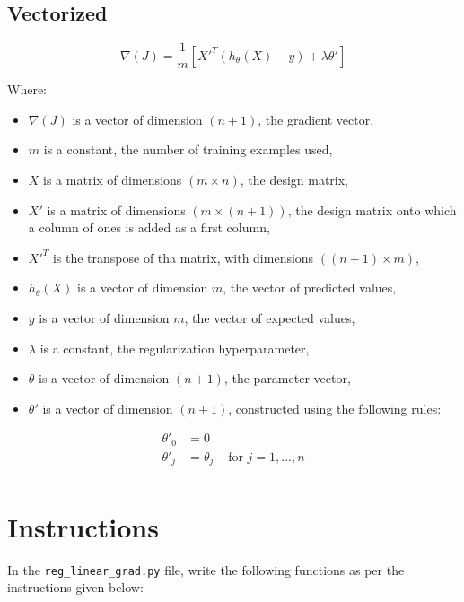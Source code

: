 \documentclass{42-en}
\begin{document}
\subsection*{Vectorized}
$$
\nabla(J) = \frac{1}{m} [X'^T(h_\theta(X) - y) + \lambda \theta']
$$  

Where:
\begin{itemize}
  \item $\nabla(J)$ is a vector of dimension $(n + 1)$, the gradient vector,
  \item $m$ is a constant, the number of training examples used,
  \item $X$ is a matrix of dimensions $(m \times n)$, the design matrix,
  \item $X'$ is a matrix of dimensions $(m \times (n + 1))$, the design matrix onto which a column of ones is added as a first column,
  \item $X'^T$ is the transpose of tha matrix, with dimensions $((n + 1) \times m)$,
  \item $h_\theta(X)$ is a vector of dimension $m$, the vector of predicted values, 
  \item $y$ is a vector of dimension $m$, the vector of expected values,
  \item $\lambda$ is a constant, the regularization hyperparameter,
  \item $\theta$ is a vector of dimension $(n + 1)$, the parameter vector,
  \item $\theta'$ is a vector of dimension $(n + 1)$, constructed using the following rules: 
\end{itemize}

$$
\begin{matrix}
\theta'_0 & =  0 \\
\theta'_j & =  \theta_j & \text{ for } j = 1, \dots, n\\
\end{matrix}
$$

\section*{Instructions}
In the \texttt{reg\_linear\_grad.py} file, write the following functions as per the instructions given below:
\end{document}
